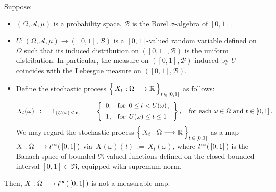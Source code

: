 \begin{example}
\mbox{}\vskip 0.1cm
\noindent
Suppose:
\begin{itemize}
\item
	$(\Omega,\mathcal{A},\mu)$ is a probability space.
	$\mathcal{B}$ is the Borel $\sigma$-algebra of $[0,1]$.
\item
	$U : (\Omega,\mathcal{A},\mu) \longrightarrow ([0,1],\mathcal{B})$
	is a $[0,1]$-valued random variable defined on $\Omega$
	such that its induced distribution on $([0,1],\mathcal{B})$
	is the uniform distribution.
	In particular, the measure on $([0,1],\mathcal{B})$ induced by $U$
	coincides with the Lebesgue measure on $([0,1],\mathcal{B})$.
\item
	Define the stochastic process
	$\left\{\, X_{t} : \Omega \overset{{\color{white}-}}{\longrightarrow} \Re \,\right\}_{t\,\in\,[0,1]}$
	as follows:
	\begin{equation*}
	X_{t}(\omega)
	\;\; := \;\;
		1_{\{U(\omega)\,\leq\,t\}}
	\;\; = \;\;
		\left\{\begin{array}{cl}
		0, & \textnormal{for \,$0 \leq t < U(\omega)$}\,,
		\\
		\overset{{\color{white}+}}{1}, & \textnormal{for \,$U(\omega) \leq t \leq 1$}
		\end{array}\right\},
	\quad
	\textnormal{for each $\omega \in \Omega$ and $t \in [0,1]$}\,.
	\end{equation*}
	We may regard the stochastic process
	$\left\{\, X_{t} : \Omega \overset{{\color{white}-}}{\longrightarrow} \Re \,\right\}_{t\,\in\,[0,1]}$
	as a map
	$X : \Omega \longrightarrow l^{\infty}(\,[\overset{{\color{white}.}}{0},1]\,)$
	via \,$X(\omega)(t) \, := \, X_{t}(\omega)$,
	where  
	$l^{\infty}(\,[\overset{{\color{white}.}}{0},1]\,)$
	is the Banach space of bounded $\Re$-valued functions defined on
	the closed bounded interval $[0,1] \subset \Re$, equipped with supremum norm.
\end{itemize}
Then,
$X : \Omega \longrightarrow l^{\infty}(\,[\overset{{\color{white}.}}{0},1]\,)$
is not a measurable map.
\end{example}
